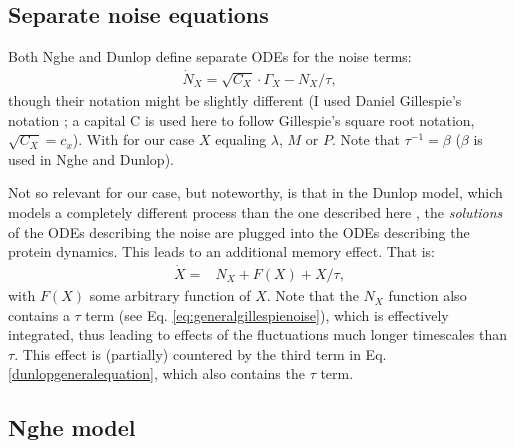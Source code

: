\subsection*{Separate noise equations}

Both Nghe and Dunlop define separate ODEs for the noise terms:
%
\begin{align}
\label{eq:generalgillespienoise}
\dot{N}_X = \sqrt{C_X} \cdot \Gamma_X - N_X/\tau
,
\end{align}
%
though their notation might be slightly different (I used Daniel Gillespie's notation \cite{Gillespie1996}; a capital C is used here to follow Gillespie's square root notation, $\sqrt{C_X}=c_x$).
With for our case $X$ equaling $\lambda$, $M$ or $P$. Note that $\tau^{-1}=\beta$ ($\beta$ is used in Nghe and Dunlop).

Not so relevant for our case, but noteworthy, is that in the Dunlop model, which models a completely different process than the one described here \cite{Dunlop2008}, the \textit{solutions} of the ODEs describing the noise are plugged into the ODEs describing the protein dynamics. This leads to an additional memory effect.
%
That is:
%
\begin{align}
\label{dunlopgeneralequation}
\dot{X} = & N_X  + F(X) + X/\tau
,
\end{align}
%
with $F(X)$ some arbitrary function of $X$. 
Note that the $N_X$ function also contains a $\tau$ term (see Eq. \ref{eq:generalgillespienoise}), which is effectively integrated, thus leading to effects of the fluctuations much longer timescales than $\tau$. 
This effect is (partially) countered by the third term in Eq. \ref{dunlopgeneralequation}, which also contains the $\tau$ term.

\subsection*{Nghe model}

